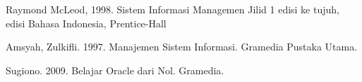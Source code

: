 \documentclass{jtetiproposalskripsi}
\begin{document}

\begin{thebibliography}{9}

Raymond McLeod, 1998. Sistem Informasi Managemen Jilid 1 edisi ke tujuh, edisi Bahasa Indonesia, Prentice-Hall

Amsyah, Zulkifli. 1997. Manajemen Sistem Informasi. Gramedia Pustaka Utama.

Sugiono. 2009. Belajar Oracle dari Nol. Gramedia.


\end{thebibliography}
\end{document}
